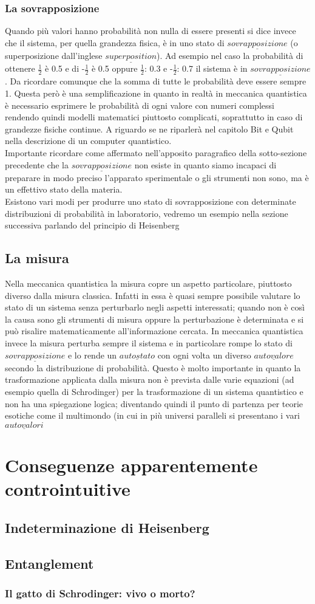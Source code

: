 \subsubsection{La sovrapposizione}
Quando più valori hanno probabilità non nulla di essere presenti si dice invece che il sistema, per quella grandezza fisica, è in uno stato di $\underline{sovrapposizione}$ (o superposizione dall'inglese $\underline{superposition}$). Ad esempio nel caso la probabilità di ottenere $\frac{1}{2}$ è 0.5 e di -$\frac{1}{2}$ è 0.5 oppure $\frac{1}{2}$: 0.3 e -$\frac{1}{2}$: 0.7 il sistema è in $\underline{sovrapposizione}$. Da ricordare comunque che la somma di tutte le probabilità deve essere sempre 1. Questa però è una semplificazione in quanto in realtà in meccanica quantistica è necessario esprimere le probabilità di ogni valore con numeri complessi rendendo quindi modelli matematici piuttosto complicati, soprattutto in caso di grandezze fisiche continue. A riguardo se ne riparlerà nel capitolo Bit e Qubit nella descrizione di un computer quantistico.\\
Importante ricordare come affermato nell'apposito paragrafico della sotto-sezione precedente che la $\underline{sovrapposizione}$ non esiste in quanto siamo incapaci di preparare in modo preciso l'apparato sperimentale o gli strumenti non sono, ma è un effettivo stato  della materia.\\
Esistono vari modi per produrre uno stato di sovrapposizione con determinate distribuzioni di probabilità in laboratorio, vedremo un esempio nella sezione successiva parlando del principio di Heisenberg
\subsection{La misura}
Nella meccanica quantistica la misura copre un aspetto particolare, piuttosto diverso dalla misura classica.
Infatti in essa è quasi sempre possibile valutare lo stato di un sistema senza perturbarlo negli aspetti interessati; quando non è così la causa sono gli strumenti di misura oppure la perturbazione è determinata e si può risalire matematicamente all'informazione cercata.
In meccanica quantistica invece la misura perturba sempre il sistema e in particolare rompe lo stato di $\underline{sovrapposizione}$ e lo rende un $\underline{autostato}$ con ogni volta un diverso $\underline{autovalore}$ secondo la distribuzione di probabilità.
Questo è molto importante in quanto la trasformazione applicata dalla misura non è prevista dalle varie equazioni (ad esempio quella di Schrodinger) per la trasformazione di un sistema quantistico e non ha una spiegazione logica; diventando quindi il punto di partenza per teorie esotiche come il multimondo (in cui in più universi paralleli si presentano i vari $\underline{autovalori}$
\section{Conseguenze apparentemente controintuitive}
\subsection{Indeterminazione di Heisenberg}
\subsection{Entanglement}
\label{sec:entanglement}
\subsubsection{Il gatto di Schrodinger: vivo o morto?}

